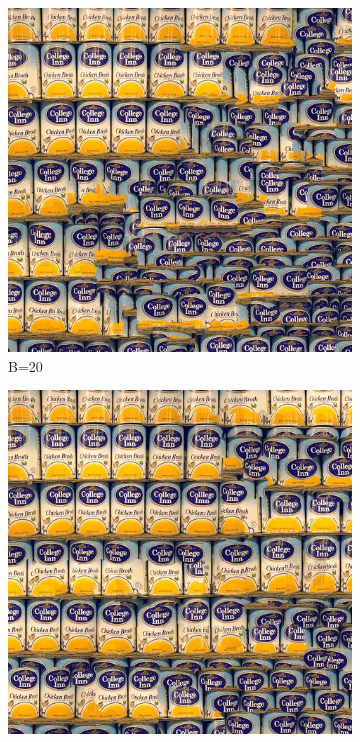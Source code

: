 \documentclass[10pt,twocolumn,letterpaper]{article}
\begin{document}
\begin{figure}[h]
    \centering
    \begin{subfigure}[h]{0.2\textwidth}
        \centering
        \includegraphics[scale=0.15]{../results/syn/out_cans_B_20.png}
        \caption{B=20}
    \end{subfigure}
    \hfill
    \begin{subfigure}[h]{0.2\textwidth}
       \centering
       \includegraphics[scale=0.15]{../results/syn/out_cans_B_30.png}

\end{subfigure}
\end{figure}
\end{document}
